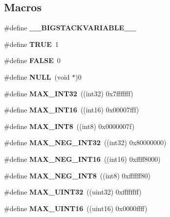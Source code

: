 \subsection*{Macros}
\begin{DoxyCompactItemize}
\item 
\#define {\bfseries \-\_\-\-\_\-\-B\-I\-G\-S\-T\-A\-C\-K\-V\-A\-R\-I\-A\-B\-L\-E\-\_\-\-\_\-}\label{prim__type_8h_a64d603953ff96570ac4072daaeaeb36b}

\item 
\#define {\bfseries T\-R\-U\-E}~1\label{prim__type_8h_aa8cecfc5c5c054d2875c03e77b7be15d}

\item 
\#define {\bfseries F\-A\-L\-S\-E}~0\label{prim__type_8h_aa93f0eb578d23995850d61f7d61c55c1}

\item 
\#define {\bfseries N\-U\-L\-L}~(void $\ast$)0\label{prim__type_8h_a070d2ce7b6bb7e5c05602aa8c308d0c4}

\item 
\#define {\bfseries M\-A\-X\-\_\-\-I\-N\-T32}~((int32) 0x7fffffff)\label{prim__type_8h_aac62d87844689a18b6f5339a89ed6e7f}

\item 
\#define {\bfseries M\-A\-X\-\_\-\-I\-N\-T16}~((int16) 0x00007fff)\label{prim__type_8h_a3905e54374e49708219791e7d59c60fb}

\item 
\#define {\bfseries M\-A\-X\-\_\-\-I\-N\-T8}~((int8)  0x0000007f)\label{prim__type_8h_aa092b7d509790c28edc065b23de6e39e}

\item 
\#define {\bfseries M\-A\-X\-\_\-\-N\-E\-G\-\_\-\-I\-N\-T32}~((int32) 0x80000000)\label{prim__type_8h_a29962133c3b9c5c2cf72f7d9299fd4a0}

\item 
\#define {\bfseries M\-A\-X\-\_\-\-N\-E\-G\-\_\-\-I\-N\-T16}~((int16) 0xffff8000)\label{prim__type_8h_a4338527c828e68762d8b40e01f0e0869}

\item 
\#define {\bfseries M\-A\-X\-\_\-\-N\-E\-G\-\_\-\-I\-N\-T8}~((int8)  0xffffff80)\label{prim__type_8h_a76a3e608c93aff0ad98b3b742c51d38f}

\item 
\#define {\bfseries M\-A\-X\-\_\-\-U\-I\-N\-T32}~((uint32) 0xffffffff)\label{prim__type_8h_a26248174abf27973b9edfa9b70ba4c93}

\item 
\#define {\bfseries M\-A\-X\-\_\-\-U\-I\-N\-T16}~((uint16) 0x0000ffff)\label{prim__type_8h_abc023544d8096a8fa1bd1f6f6f90bc41}


\end{DoxyCompactItemize}
